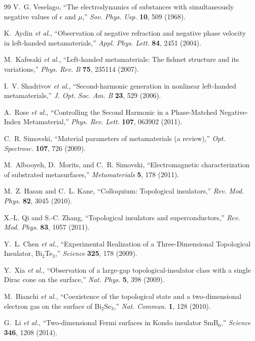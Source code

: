 \documentclass[aps,prb,twocolumn,superscriptaddress,floatfix,nofootinbib,longbibliography]{revtex4-2}
\begin{document}
\begin{thebibliography}{99}
V.~G. Veselago, ``The electrodynamics of substances with simultaneously
negative values of $\epsilon$ and $\mu$,'' \textit{Sov. Phys. Usp.}
\textbf{10}, 509 (1968).

K.~Aydin \textit{et al.}, ``Observation of negative refraction and negative
phase velocity in left-handed metamaterials,'' \textit{Appl. Phys. Lett.}
\textbf{84}, 2451 (2004).

M.~Kafesaki \textit{et al.}, ``Left-handed metamaterials: The fishnet
structure and its variations,'' \textit{Phys. Rev. B} \textbf{75}, 235114 (2007).

I.~V. Shadrivov \textit{et al.}, ``Second-harmonic generation in nonlinear
left-handed metamaterials,'' \textit{J. Opt. Soc. Am. B} \textbf{23}, 529 (2006).

A.~Rose \textit{et al.}, ``Controlling the Second Harmonic in a Phase-Matched
Negative-Index Metamaterial,'' \textit{Phys. Rev. Lett.} \textbf{107}, 063902
(2011).

C.~R. Simovski, ``Material parameters of metamaterials (a review),''
\textit{Opt. Spectrosc.} \textbf{107}, 726 (2009).

M.~Albooyeh, D.~Morits, and C.~R. Simovski, ``Electromagnetic
characterization of substrated metasurfaces,'' \textit{Metamaterials}
\textbf{5}, 178 (2011).

M.~Z. Hasan and C.~L. Kane, ``Colloquium: Topological insulators,''
\textit{Rev. Mod. Phys.} \textbf{82}, 3045 (2010).

X.-L. Qi and S.-C. Zhang, ``Topological insulators and superconductors,''
\textit{Rev. Mod. Phys.} \textbf{83}, 1057 (2011).

Y.~L. Chen \textit{et al.}, ``Experimental Realization of a
Three-Dimensional Topological Insulator, Bi$_2$Te$_3$,'' \textit{Science}
\textbf{325}, 178 (2009).

Y.~Xia \textit{et al.}, ``Observation of a large-gap topological-insulator
class with a single Dirac cone on the surface,'' \textit{Nat. Phys.}
\textbf{5}, 398 (2009).

M.~Bianchi \textit{et al.}, ``Coexistence of the topological state and a
two-dimensional electron gas on the surface of Bi$_2$Se$_3$,''
\textit{Nat. Commun.} \textbf{1}, 128 (2010).

G.~Li \textit{et al.}, ``Two-dimensional Fermi surfaces in Kondo insulator
SmB$_6$,'' \textit{Science} \textbf{346}, 1208 (2014).


\end{thebibliography}
\end{document}
